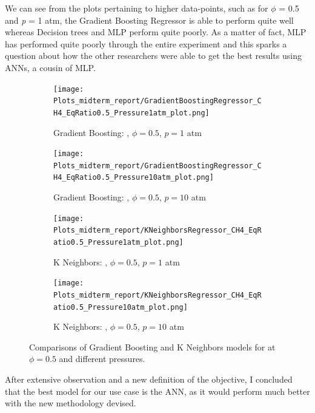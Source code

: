 \documentclass[12pt]{report}
\begin{document}
We can see from the plots pertaining to higher data-points, such as for $\phi$ = 0.5 and \textit{p} = 1 atm, the Gradient Boosting Regressor is able to perform quite well whereas Decision trees and MLP perform quite poorly. As a matter of fact, MLP has performed quite poorly through the entire experiment and this sparks a question about how the other researchers were able to get the best results using ANNs, a cousin of MLP.
\begin{figure}[H]
    \centering
    \begin{subfigure}[t]{0.48\textwidth}
        \centering
        \texttt{[image: Plots\_midterm\_report/GradientBoostingRegressor\_CH4\_EqRatio0.5\_Pressure1atm\_plot.png]}
        \caption{Gradient Boosting: , $\phi = 0.5$, $p = 1$ atm}
    \end{subfigure}
    \hfill
    \begin{subfigure}[t]{0.48\textwidth}
        \centering
        \texttt{[image: Plots\_midterm\_report/GradientBoostingRegressor\_CH4\_EqRatio0.5\_Pressure10atm\_plot.png]}
        \caption{Gradient Boosting: , $\phi = 0.5$, $p = 10$ atm}
    \end{subfigure}

    \vspace{0.5cm} %

    \begin{subfigure}[t]{0.48\textwidth}
        \centering
        \texttt{[image: Plots\_midterm\_report/KNeighborsRegressor\_CH4\_EqRatio0.5\_Pressure1atm\_plot.png]}
        \caption{K Neighbors: , $\phi = 0.5$, $p = 1$ atm}
    \end{subfigure}
    \hfill
    \begin{subfigure}[t]{0.48\textwidth}
        \centering
        \texttt{[image: Plots\_midterm\_report/KNeighborsRegressor\_CH4\_EqRatio0.5\_Pressure10atm\_plot.png]}
        \caption{K Neighbors: , $\phi = 0.5$, $p = 10$ atm}
    \end{subfigure}

    \caption{Comparisons of Gradient Boosting and K Neighbors models for  at $\phi = 0.5$ and different pressures.}
\end{figure}

After extensive observation and a new definition of the objective, I concluded that the best model for our use case is the ANN, as it would perform much better with the new methodology devised.
\end{document}
